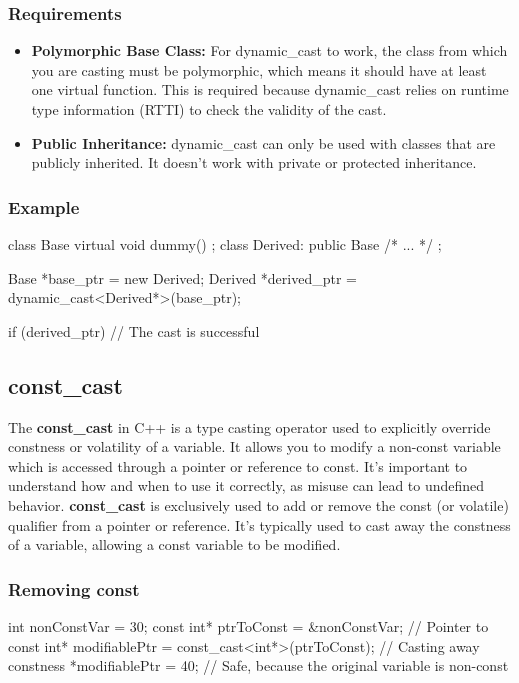\documentclass{report}
\begin{document}
\begin{concept}
   \bigbreak \noindent 
   \subsubsection{Requirements}
   \begin{itemize}
        \item \textbf{Polymorphic Base Class:} For dynamic\_cast to work, the class from which you are casting must be polymorphic, which means it should have at least one virtual function. This is required because dynamic\_cast relies on runtime type information (RTTI) to check the validity of the cast.
        \item \textbf{Public Inheritance:} dynamic\_cast can only be used with classes that are publicly inherited. It doesn’t work with private or protected inheritance.
   \end{itemize}

   \bigbreak \noindent 
   \subsubsection{Example}
   \bigbreak \noindent 
   \begin{cppcode}
class Base { virtual void dummy() {} };
class Derived: public Base { /* ... */ };

Base *base_ptr = new Derived;
Derived *derived_ptr = dynamic_cast<Derived*>(base_ptr);

if (derived_ptr) {
    // The cast is successful
}
   \end{cppcode}
    

    \bigbreak \noindent 
    \subsection{const\_cast}
    \bigbreak \noindent 
    \begin{concept}
        The \textbf{const\_cast} in C++ is a type casting operator used to explicitly override constness or volatility of a variable. It allows you to modify a non-const variable which is accessed through a pointer or reference to const. It's important to understand how and when to use it correctly, as misuse can lead to undefined behavior.
        \bigbreak \noindent 
        \textbf{const\_cast} is exclusively used to add or remove the const (or volatile) qualifier from a pointer or reference. It's typically used to cast away the constness of a variable, allowing a const variable to be modified.
    \end{concept}
    \subsubsection{Removing const}
    \bigbreak \noindent 
    \begin{cppcode}
    int nonConstVar = 30;
    const int* ptrToConst = &nonConstVar; // Pointer to const
    int* modifiablePtr = const_cast<int*>(ptrToConst); // Casting away constness
    *modifiablePtr = 40; // Safe, because the original variable is non-const


\end{cppcode}
\end{concept}
\end{document}

